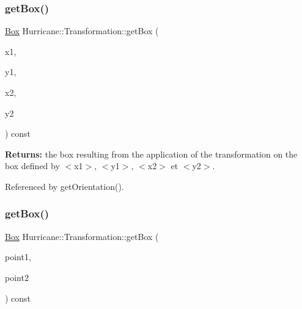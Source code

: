 \subsubsection{\texorpdfstring{get\+Box()}{getBox()}\hspace{0.1cm}{\footnotesize\ttfamily [1/3]}}
{\footnotesize\ttfamily \hyperlink{classHurricane_1_1Box}{Box} Hurricane\+::\+Transformation\+::get\+Box (\begin{DoxyParamCaption}\item[{const \hyperlink{group__DbUGroup_ga4fbfa3e8c89347af76c9628ea06c4146}{Db\+U\+::\+Unit} \&}]{x1,  }\item[{const \hyperlink{group__DbUGroup_ga4fbfa3e8c89347af76c9628ea06c4146}{Db\+U\+::\+Unit} \&}]{y1,  }\item[{const \hyperlink{group__DbUGroup_ga4fbfa3e8c89347af76c9628ea06c4146}{Db\+U\+::\+Unit} \&}]{x2,  }\item[{const \hyperlink{group__DbUGroup_ga4fbfa3e8c89347af76c9628ea06c4146}{Db\+U\+::\+Unit} \&}]{y2 }\end{DoxyParamCaption}) const}

{\bfseries Returns\+:} the box resulting from the application of the transformation on the box defined by {\ttfamily $<$x1$>$}, {\ttfamily $<$y1$>$}, {\ttfamily $<$x2$>$} et {\ttfamily $<$y2$>$}. 

Referenced by get\+Orientation().

\mbox{\label{classHurricane_1_1Transformation_a4d3ad1601d31e05c76bda4b417445aff}} 
\subsubsection{\texorpdfstring{get\+Box()}{getBox()}\hspace{0.1cm}{\footnotesize\ttfamily [2/3]}}
{\footnotesize\ttfamily \hyperlink{classHurricane_1_1Box}{Box} Hurricane\+::\+Transformation\+::get\+Box (\begin{DoxyParamCaption}\item[{const \hyperlink{classHurricane_1_1Point}{Point} \&}]{point1,  }\item[{const \hyperlink{classHurricane_1_1Point}{Point} \&}]{point2 }\end{DoxyParamCaption}) const}

